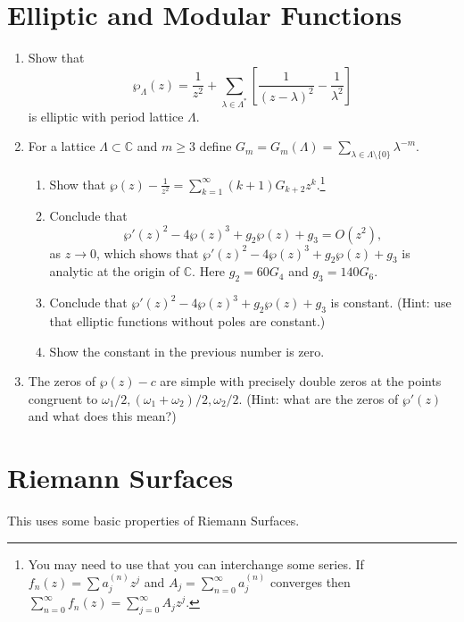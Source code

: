 \documentclass[a4paper,10pt]{article}
\newcommand{\CC}{\mathbb{C}}
\begin{document}
\section{Elliptic and Modular Functions} 

\begin{enumerate}
\item Show that 
$$ \wp_{\Lambda}(z) = \frac{1}{z^2} + \sum_{\lambda \in \Lambda^*} \left[ \frac{1}{(z-\lambda)^2} - \frac{1}{\lambda^2} \right] $$
is elliptic with period lattice $\Lambda$.

\item For a lattice $\Lambda \subset \CC$ and $m\geq 3$ define $G_m = G_m(\Lambda) =  \sum_{\lambda \in \Lambda\setminus \lbrace 0 \rbrace } \lambda^{-m}. $   
\begin{enumerate}
	\item Show that $ \wp(z) - \frac{1}{z^2} = \sum_{k=1}^{\infty} (k+1)G_{k+2} z^k.$\footnote{You may need to use that you can interchange some series. If $f_n(z) = \sum a_j^{(n)} z^j$ and $A_j = \sum_{n=0}^{\infty} a_j^{(n)} $ converges then $\sum_{n=0}^{\infty} f_n(z) = \sum_{j=0}^{\infty} A_j z^j$. } 
	\item Conclude that 
	$$ \wp'(z)^2 - 4 \wp(z)^3 + g_2 \wp(z) + g_3 = O(z^2),$$
	as $z \to 0$, which shows that $\wp'(z)^2 - 4 \wp(z)^3 + g_2 \wp(z) + g_3$ is analytic at the origin of $\CC$. 
	Here $g_2 = 60 G_4$ and $g_3 = 140 G_6$.
	\item Conclude that $\wp'(z)^2 - 4 \wp(z)^3 + g_2 \wp(z) + g_3$ is constant. (Hint: use that elliptic functions without poles are constant.)
	\item Show the constant in the previous number is zero.
\end{enumerate}

\item The zeros of $\wp(z)-c$ are simple with precisely double zeros at the points congruent to $\omega_1/2, (\omega_1+\omega_2)/2, \omega_2/2$. (Hint: what are the zeros of $\wp'(z)$ and what does this mean?)

\end{enumerate}



\section{Riemann Surfaces}
This uses some basic properties of Riemann Surfaces.
\end{document}
